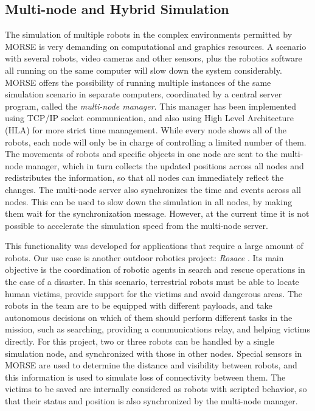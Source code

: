 \documentclass{llncs}
\newcommand{\serge}[1]{\nb{Serge}{blue}{#1}}
\newcommand{\gilberto}[1]{\nb{Gilberto}{red}{#1}}
\begin{document}
\subsection{Multi-node and Hybrid Simulation}
\label{section:multinode}

The simulation of multiple robots in the complex environments permitted by
MORSE is very demanding on computational and graphics resources.
A scenario with several robots, video cameras and
other sensors, plus the robotics software all running on the same computer will
slow down the system considerably. MORSE offers the possibility of running
multiple instances of the same simulation scenario in separate computers,
coordinated by a central server program, called the \emph{multi-node
manager}. This manager has been implemented using TCP/IP socket communication,
and also using High Level Architecture (HLA) \cite{Kuhl:1999:CCS:318931} for
more strict time management.
While every node shows all of the robots, each node will only
be in charge of controlling a limited number of them. The movements
of robots and specific objects in one node are sent to the multi-node
manager, which in turn collects the updated positions across all nodes
and redistributes the information, so that all nodes can immediately
reflect the changes. The multi-node server also 
synchronizes the time and events across all nodes. This can be used
to slow down the simulation in all nodes, by making them wait for the
synchronization message. However, at the current time it is not possible to
accelerate the simulation speed from the multi-node server.

This functionality was developed for applications that require a large amount
of robots. Our use case is another outdoor robotics project: \emph{Rosace}
\cite{springerlink:10.1007/978-3-642-28786-2_32}.
Its main objective is the coordination of robotic agents in search and rescue
operations in the case of a disaster. In this scenario, terrestrial robots must
be able to locate human victims, provide support for the victims and avoid
dangerous areas. The robots in the team are to be equipped with different
payloads, and take autonomous decisions on which of them should perform
different tasks in the mission, such as searching, providing a communications
relay, and helping victims directly.
For this project, two or three robots can be handled by a single simulation
node, and synchronized with those in other nodes.  Special sensors in MORSE are
used to determine the distance and visibility between robots, and this
information is used to simulate loss of connectivity between them.
The victims to be saved are internally considered as robots with scripted
behavior, so that their status and position is also synchronized by the
multi-node manager.
\end{document}
